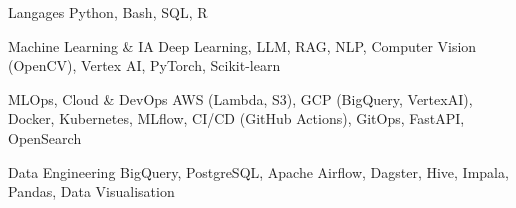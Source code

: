 

\begin{cvskills}

  \cvskill
    {Langages} %
    {Python, Bash, SQL, R} %

  \cvskill
    {Machine Learning \& IA} %
    {Deep Learning, LLM, RAG, NLP, Computer Vision (OpenCV), Vertex AI, PyTorch, Scikit-learn} %

  \cvskill
    {MLOps, Cloud \& DevOps} %
    {AWS (Lambda, S3), GCP (BigQuery, VertexAI), Docker, Kubernetes, \newline MLflow, CI/CD (GitHub Actions), GitOps, FastAPI, OpenSearch} %
    
  \cvskill
    {Data Engineering} %
    {BigQuery, PostgreSQL, Apache Airflow, Dagster, Hive, Impala, Pandas, Data Visualisation} %




\end{cvskills}
